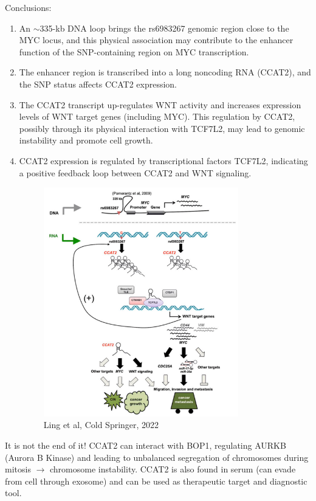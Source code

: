 Conclusions:

\begin{enumerate}
\def\labelenumi{\arabic{enumi}.}
\item
  An $\sim$335-kb DNA loop brings the rs6983267 genomic region close to the MYC locus, and this physical association may contribute to the enhancer function of the SNP-containing region on MYC transcription.
\item
  The enhancer region is transcribed into a long noncoding RNA (CCAT2), and the SNP status affects CCAT2 expression.
\item
  The CCAT2 transcript up-regulates WNT activity and increases expression levels of WNT target genes (including MYC). This regulation by CCAT2, possibly through its physical interaction with TCF7L2, may lead to genomic instability and promote cell growth.
\item
  CCAT2 expression is regulated by transcriptional factors TCF7L2, indicating a positive feedback loop between CCAT2 and WNT signaling.

  \begin{figure}
  \centering
  \includegraphics[width=0.8\textwidth]{../_resources/Screenshot_2022-10-14_at_11-20-37.png}
  \caption{Ling et al, Cold Springer, 2022}
  \end{figure}
\end{enumerate}

It is not the end of it! CCAT2 can interact with BOP1, regulating AURKB (Aurora B Kinase) and leading to unbalanced segregation of chromosomes during mitosis $\rightarrow$ chromosome instability. CCAT2 is also found in serum (can evade from cell through exosome) and can be used as therapeutic target and diagnostic tool.
